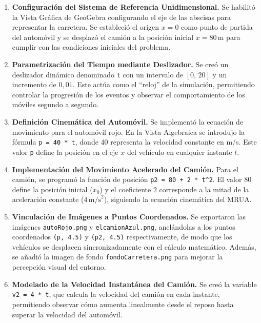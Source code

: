\begin{enumerate}
    \item \textbf{Configuración del Sistema de Referencia Unidimensional.}
    Se habilitó la Vista Gráfica de GeoGebra configurando el eje de las abscisas para representar la carretera. Se estableció el origen $x = 0$ como punto de partida del automóvil y se desplazó el camión a la posición inicial $x = 80$\,m para cumplir con las condiciones iniciales del problema.

    \item \textbf{Parametrización del Tiempo mediante Deslizador.}
    Se creó un deslizador dinámico denominado \texttt{t} con un intervalo de $[0,\,20]$ y un incremento de $0{,}01$. Este actúa como el ``reloj'' de la simulación, permitiendo controlar la progresión de los eventos y observar el comportamiento de los móviles segundo a segundo.

    \item \textbf{Definición Cinemática del Automóvil.}
    Se implementó la ecuación de movimiento para el automóvil rojo. En la Vista Algebraica se introdujo la fórmula \texttt{p = 40 * t}, donde 40 representa la velocidad constante en m/s. Este valor \texttt{p} define la posición en el eje $x$ del vehículo en cualquier instante $t$.

    \item \textbf{Implementación del Movimiento Acelerado del Camión.}
    Para el camión, se programó la función de posición \texttt{p2 = 80 + 2 * t\^{}2}. El valor $80$ define la posición inicial ($x_0$) y el coeficiente $2$ corresponde a la mitad de la aceleración constante ($4\,\text{m/s}^2$), siguiendo la ecuación cinemática del MRUA.

    \item \textbf{Vinculación de Imágenes a Puntos Coordenados.}
    Se exportaron las imágenes \texttt{autoRojo.png} y \texttt{elcamionAzul.png}, anclándolas a los puntos coordenados \texttt{(p, 4.5)} y \texttt{(p2, 4.5)} respectivamente, de modo que los vehículos se desplacen sincronizadamente con el cálculo matemático. Además, se añadió la imagen de fondo \texttt{fondoCarretera.png} para mejorar la percepción visual del entorno.

    \item \textbf{Modelado de la Velocidad Instantánea del Camión.}
    Se creó la variable \texttt{v2 = 4 * t}, que calcula la velocidad del camión en cada instante, permitiendo observar cómo aumenta linealmente desde el reposo hasta superar la velocidad del automóvil.


\end{enumerate}
